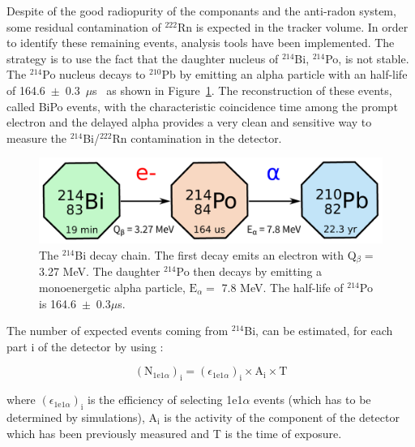 \documentclass[main.tex]{subfiles}
\begin{document}
\noindent Despite of the good radiopurity of the componants and the anti-radon system, some residual contamination of $^{\text{222}}$Rn is expected in the tracker volume. In order to identify these remaining events, analysis tools have been implemented. The strategy is to use the fact that the daughter nucleus of $^{\text{214}}$Bi, $^{\text{214}}$Po, is not stable. The $^{\text{214}}$Po nucleus decays to $^{\text{210}}$Pb by emitting an alpha particle with an half-life of 164.6~$\pm$~0.3~$\mu$s~\cite{NuclearDataSheet210} as shown in Figure~\ref{BiPoChain}. The reconstruction of these events, called BiPo events, with the characteristic coincidence time among the prompt electron and the delayed alpha provides a very clean and sensitive way to measure the $^{\text{214}}$Bi/$^{\text{222}}$Rn contamination in the detector.   


\begin{figure}[h!]
\begin{center}
\includegraphics[scale=0.6]{pictures/Chap5/decay_chain_bi.pdf}
\caption{The $^{\text{214}}$Bi decay chain. The first decay emits an electron with Q$_{\beta} =$ 3.27 MeV. The daughter $^{\text{214}}$Po then decays by emitting a monoenergetic alpha particle, $\text{E}_{\alpha} =$ 7.8 MeV. The half-life of $^{\text{214}}$Po is 164.6~$\pm$~0.3$\mu$s.}
\label{BiPoChain}
\end{center}
\end{figure}


\bigskip


\NI The number of expected events coming from $^{\text{214}}$Bi, can be estimated, for each part i of the detector by using :


\begin{equation}
(\text{N}_{\text{1e1}\alpha})_\text{i} = (\epsilon_{\text{1e1}\alpha})_\text{i} \times \text{A}_\text{i} \times \text{T}
\label{eq_number_of_expected_events}
\end{equation}


\noindent where $(\epsilon_{\text{1e1}\alpha})_\text{i}$ is the efficiency of selecting 1e1$\alpha$ events (which has to be determined by simulations), A$_\text{i}$ is the activity of the component of the detector which has been previously measured and T is the time of exposure. 
\end{document}

